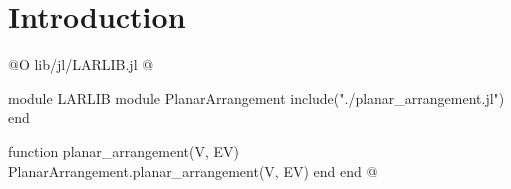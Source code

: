\chapter{Introduction}

@O lib/jl/LARLIB.jl
@{module LARLIB
    module PlanarArrangement
        include("./planar_arrangement.jl")
    end

    function planar_arrangement(V, EV)
        PlanarArrangement.planar_arrangement(V, EV)
    end
end
@}